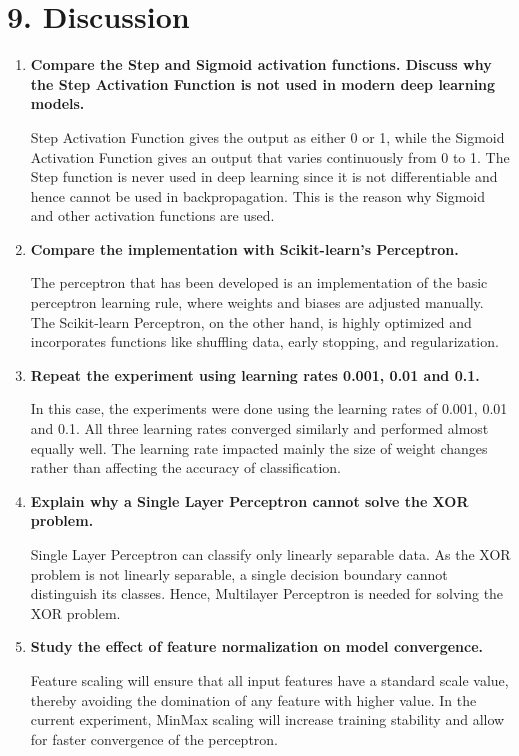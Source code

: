 \documentclass[11pt]{article}
\begin{document}

\section*{9. Discussion}

\begin{enumerate}[leftmargin=*]
\item \textbf{Compare the Step and Sigmoid activation functions. Discuss why the Step Activation Function is not used in modern deep learning models.}

Step Activation Function gives the output as either 0 or 1, while the Sigmoid Activation Function gives an output that varies continuously from 0 to 1. The Step function is never used in deep learning since it is not differentiable and hence cannot be used in backpropagation. This is the reason why Sigmoid and other activation functions are used.

\item \textbf{Compare the implementation with Scikit-learn's Perceptron.}

The perceptron that has been developed is an implementation of the basic perceptron learning rule, where weights and biases are adjusted manually. The Scikit-learn Perceptron, on the other hand, is highly optimized and incorporates functions like shuffling data, early stopping, and regularization.

\item \textbf{Repeat the experiment using learning rates 0.001, 0.01 and 0.1.}

In this case, the experiments were done using the learning rates of 0.001, 0.01 and 0.1. All three learning rates converged similarly and performed almost equally well. The learning rate impacted mainly the size of weight changes rather than affecting the accuracy of classification.

\item \textbf{Explain why a Single Layer Perceptron cannot solve the XOR problem.}

Single Layer Perceptron can classify only linearly separable data. As the XOR problem is not linearly separable, a single decision boundary cannot distinguish its classes. Hence, Multilayer Perceptron is needed for solving the XOR problem.

\item \textbf{Study the effect of feature normalization on model convergence.}

Feature scaling will ensure that all input features have a standard scale value, thereby avoiding the domination of any feature with higher value. In the current experiment, MinMax scaling will increase training stability and allow for faster convergence of the perceptron.
\end{enumerate}
\end{document}
